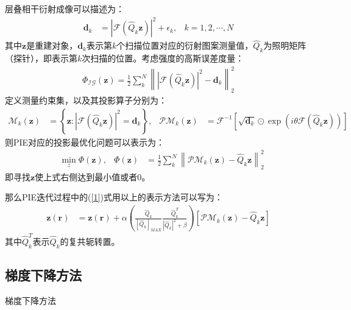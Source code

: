 \documentclass[10pt,aspectratio=169]{beamer} %
\renewcommand{\vec}[1]{\boldsymbol{#1}} %
\begin{document}
\begin{frame}[allowframebreaks]
    层叠相干衍射成像可以描述为：
    \begin{align*}
        \vec{d}_k & =|\mathcal{F} (\hat{Q}_k \vec{z})|^2+\epsilon_k, & k=1,2,\cdots ,N
    \end{align*}
    其中$\vec{z}$是重建对象，$\vec{d}_k$表示第$k$个扫描位置对应的衍射图案测量值，$\hat{Q}_k$为照明矩阵（探针），即表示第$k$次扫描的位置。考虑强度的高斯误差度量：
    \begin{align*}
        \Phi _{\mathcal{IG}}(\vec{z})=\frac{1}{2}\sum_k^N \left\lVert |\mathcal{F}(\hat{Q}_k \vec{z})|^2 -\vec{d}_k \right\rVert _2^2
    \end{align*}
    定义测量约束集，以及其投影算子分别为：
    \begin{align}
        \mathcal{M}_k (\vec{z}) & =\left\{\vec{z} : |\mathcal{F}(\hat{Q}_k \vec{z})|^2=\vec{d}_k\right\}, & \mathcal{PM}_k (\vec{z}) & =\mathcal{F}^{-1} \left[\sqrt{\vec{d}_k}\odot \exp{(i \theta \mathcal{F}(\hat{Q}_k \vec{z}))}\right] \label{2.0}
    \end{align}
    则PIE对应的投影最优化问题可以表示为：
    \begin{align}
         & \min \limits_z \Phi (\vec{z}), & \Phi (\vec{z}) & =\frac{1}{2}\sum_k^N \left\lVert \mathcal{PM}_k(\vec{z})-\hat{Q}_k \vec{z} \right\rVert _2^2 \label{2}
    \end{align}
    即寻找$\vec{z}$使上式右侧达到最小值或者0。
    
    那么PIE迭代过程中的(\ref{1})式用以上的表示方法可以写为：
    \begin{align}
        \vec{z}(\vec{r}) & =\vec{z}(\vec{r})+\alpha \left(\frac{\hat{Q}_k}{[\hat{Q}_k]_{MAX}} \frac{\hat{Q}_k^T}{|\hat{Q}_k|^2+\beta}\right)[\mathcal{PM}_k(\vec{z})-\hat{Q}_k \vec{z}] \label{3}
    \end{align}
    其中$\hat{Q}_k^T$表示$\hat{Q}_k$的复共轭转置。
\end{frame}

\subsection{梯度下降方法}

\begin{frame}
    \begin{algorithm}[H]
        \LinesNumbered
        \caption{\small 梯度下降方法}
        \label{A1}
    \end{algorithm}
\end{frame}
\end{document}
